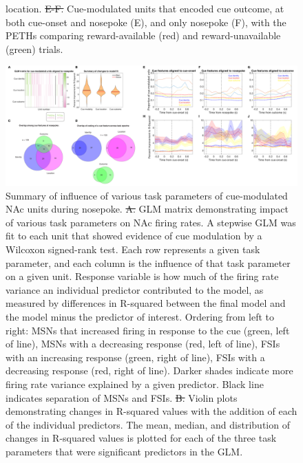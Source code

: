 \documentclass[11pt]{article}
\newcommand{\bsf}[1]{\textbf{#1}}
\providecommand{\DIFadd}[1]{{\protect\color{blue}\uwave{#1}}} %
\providecommand{\DIFdel}[1]{{\protect\color{red}\sout{#1}}}                      %
\providecommand{\DIFaddFL}[1]{\DIFadd{#1}} %
\providecommand{\DIFdelFL}[1]{\DIFdel{#1}} %
\providecommand{\DIFaddbeginFL}{} %
\providecommand{\DIFaddendFL}{} %
\providecommand{\DIFdelbeginFL}{} %
\providecommand{\DIFdelendFL}{} %
\newcommand{\DIFscaledelfig}{0.5}
\newlength{\DIFdelgraphicswidth} %
\newlength{\DIFdelgraphicsheight} %
\newcommand{\DIFaddincludegraphics}[2][]{{\color{blue}\fbox{\DIFOincludegraphics[#1]{#2}}}} %
\newcommand{\DIFdelincludegraphics}[2][]{%
\sbox{\DIFdelgraphicsbox}{\DIFOincludegraphics[#1]{#2}}%
\settoboxwidth{\DIFdelgraphicswidth}{\DIFdelgraphicsbox} %
\settoboxtotalheight{\DIFdelgraphicsheight}{\DIFdelgraphicsbox} %
\scalebox{\DIFscaledelfig}{%
\parbox[b]{\DIFdelgraphicswidth}{\usebox{\DIFdelgraphicsbox}\\[-\baselineskip] \rule{\DIFdelgraphicswidth}{0em}}\llap{\resizebox{\DIFdelgraphicswidth}{\DIFdelgraphicsheight}{%
\setlength{\unitlength}{\DIFdelgraphicswidth}%
\begin{picture}(1,1)%
\thicklines\linethickness{2pt} %
{\color[rgb]{1,0,0}\put(0,0){\framebox(1,1){}}}%
{\color[rgb]{1,0,0}\put(0,0){\line( 1,1){1}}}%
{\color[rgb]{1,0,0}\put(0,1){\line(1,-1){1}}}%
\end{picture}%
}\hspace*{3pt}}} %
} %
\DeclareRobustCommand{\DIFaddbeginFL}{\DIFOaddbeginFL \let\includegraphics\DIFaddincludegraphics} %
\DeclareRobustCommand{\DIFaddendFL}{\DIFOaddendFL \let\includegraphics\DIFOincludegraphics} %
\DeclareRobustCommand{\DIFdelbeginFL}{\DIFOdelbeginFL \let\includegraphics\DIFdelincludegraphics} %
\DeclareRobustCommand{\DIFdelendFL}{\DIFOaddendFL \let\includegraphics\DIFOincludegraphics} %
\begin{document}
{\begin{figure}[h]
{  location. \DIFdelbeginFL \DIFdelFL{E-F. }\DIFdelendFL \DIFaddbeginFL \DIFaddFL{\bsf{E-F}: }\DIFaddendFL Cue-modulated units that encoded cue outcome, at both
  cue-onset and nosepoke (E), and only nosepoke (F), with the PETHs comparing
  reward-available (red) and reward-unavailable (green) trials.}
\label{fig:NP_examples}
\end{figure}
\begin{figure}[h]
\centering
\includegraphics[width=\textwidth]{Fig 10 - NP GLM.png}
\caption{Summary of influence of various task parameters of cue-modulated NAc
  units during nosepoke. \DIFdelbeginFL \DIFdelFL{A. }\DIFdelendFL \DIFaddbeginFL \DIFaddFL{\bsf{A}: }\DIFaddendFL GLM matrix demonstrating impact of various
  task parameters on NAc firing rates. A stepwise GLM was fit to each unit that
  showed evidence of cue modulation by a Wilcoxon signed-rank test. Each row
  represents a given task parameter, and each column is the influence of that
  task parameter on a given unit. Response variable is how much of the firing
  rate variance an individual predictor contributed to the model, as measured by
  differences in R-squared between the final model and the model minus the
  predictor of interest. Ordering from left to right: MSNs that increased firing
  in response to the cue (green, left of line), MSNs with a decreasing response
  (red, left of line), FSIs with an increasing response (green, right of line),
  FSIs with a decreasing response (red, right of line). Darker shades indicate
  more firing rate variance explained by a given predictor. Black line indicates
  separation of MSNs and FSIs. \DIFdelbeginFL \DIFdelFL{B. }\DIFdelendFL \DIFaddbeginFL \DIFaddFL{\bsf{B}: }\DIFaddendFL Violin plots demonstrating changes in
  R-squared values with the addition of each of the individual predictors. The
  mean, median, and distribution of changes in R-squared values is plotted for
  each of the three task parameters that were significant predictors in the
  GLM.}
\label{fig:NP_GLM}
\end{figure}
}
\end{document}
